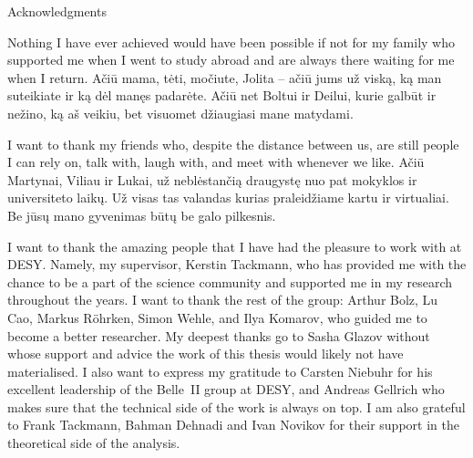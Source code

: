 \begin{abstractpage}{Acknowledgments}
    Nothing I have ever achieved would have been possible if not for my family who supported me
    when I went to study abroad and are always there waiting for me when I return.
    Ačiū mama, tėti, močiute, Jolita -- ačiū jums už viską, ką man suteikiate ir ką dėl manęs padarėte.
    Ačiū net Boltui ir Deilui, kurie galbūt ir nežino, ką aš veikiu, bet visuomet džiaugiasi mane matydami.

    I want to thank my friends who, despite the distance between us, are still people I can rely on, talk with,
    laugh with, and meet with whenever we like.
    Ačiū Martynai, Viliau ir Lukai, už neblėstančią draugystę nuo pat mokyklos ir universiteto laikų.
    Už visas tas valandas kurias praleidžiame kartu ir virtualiai.
    Be jūsų mano gyvenimas būtų be galo pilkesnis.

    I want to thank the amazing people that I have had the pleasure to work with at DESY.
    Namely, my supervisor, Kerstin Tackmann, who has provided me with the chance to be a part of the science community
    and supported me in my research throughout the years.
    I want to thank the rest of the group: Arthur Bolz, Lu Cao, Markus R\"ohrken, Simon Wehle, and Ilya Komarov, who guided me to become a better researcher.
    My deepest thanks go to Sasha Glazov without whose support and advice the work of this thesis would likely not have materialised.
    I also want to express my gratitude to Carsten Niebuhr for his excellent leadership of the Belle~II group at DESY,
    and Andreas Gellrich who makes sure that the technical side of the work is always on top.
    I am also grateful to Frank Tackmann, Bahman Dehnadi and Ivan Novikov for their support in the theoretical side of the analysis.


\end{abstractpage}
